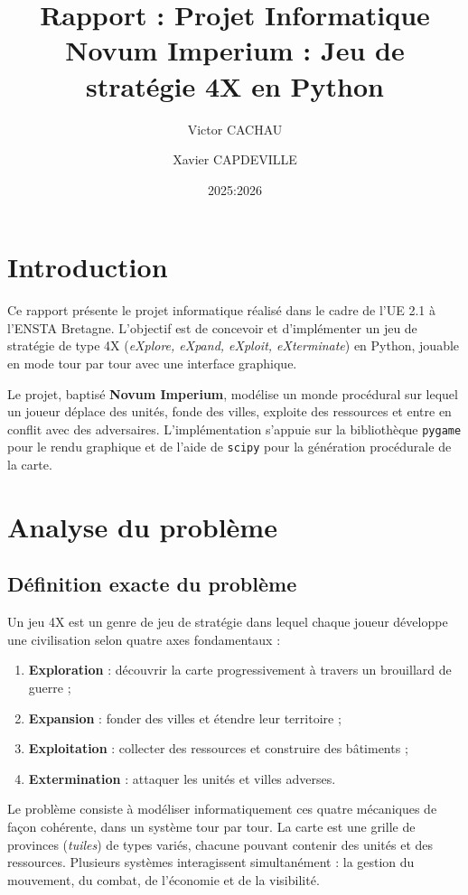 \documentclass[12pt, a4paper]{article}
\title{\textbf{Rapport : Projet Informatique}\\[0.5em]
       \large Novum Imperium : Jeu de stratégie 4X en Python}
\author{Victor CACHAU \and Xavier CAPDEVILLE}
\date{2025:2026}
\begin{document}


\thispagestyle{empty}

\newpage
\tableofcontents
\thispagestyle{fancy}

\newpage


\section{Introduction}


Ce rapport présente le projet informatique réalisé dans le cadre de l'UE 2.1 à l'ENSTA Bretagne.
L'objectif est de concevoir et d'implémenter un jeu de stratégie de type 4X (\textit{eXplore,
eXpand, eXploit, eXterminate}) en Python, jouable en mode tour par tour avec une interface
graphique.

Le projet, baptisé \textbf{Novum Imperium}, modélise un monde procédural sur lequel un joueur
déplace des unités, fonde des villes, exploite des ressources et entre en conflit avec des
adversaires. L'implémentation s'appuie sur la bibliothèque \texttt{pygame} pour le rendu
graphique et de l'aide de \texttt{scipy} pour la génération procédurale de la carte.



\section{Analyse du problème}


\subsection{Définition exacte du problème}

Un jeu 4X est un genre de jeu de stratégie dans lequel chaque joueur développe une
civilisation selon quatre axes fondamentaux :
\begin{enumerate}
    \item \textbf{Exploration} : découvrir la carte progressivement à travers un brouillard de guerre ;
    \item \textbf{Expansion} : fonder des villes et étendre leur territoire ;
    \item \textbf{Exploitation} : collecter des ressources et construire des bâtiments ;
    \item \textbf{Extermination} : attaquer les unités et villes adverses.
\end{enumerate}

Le problème consiste à modéliser informatiquement ces quatre mécaniques de façon cohérente,
dans un système tour par tour. La carte est une grille de provinces (\textit{tuiles}) de types
variés, chacune pouvant contenir des unités et des ressources. Plusieurs systèmes interagissent
simultanément : la gestion du mouvement, du combat, de l'économie et de la visibilité.
\end{document}

